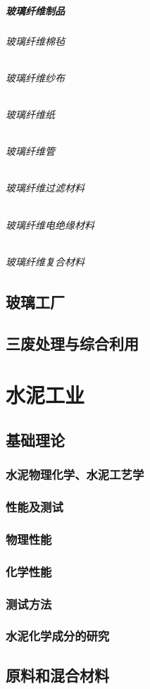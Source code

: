\documentclass[UTF8]{../../ApplicationUniverse}
\begin{document}
            \paragraph{玻璃纤维制品}
                \subparagraph{玻璃纤维棉毡}
                \subparagraph{玻璃纤维纱布}
                \subparagraph{玻璃纤维纸}
                \subparagraph{玻璃纤维管}
                \subparagraph{玻璃纤维过滤材料}
                \subparagraph{玻璃纤维电绝缘材料}
                \subparagraph{玻璃纤维复合材料}
\section{玻璃工厂}
\section{三废处理与综合利用}







\chapter{水泥工业}
\section{基础理论}
    \subsection{水泥物理化学、水泥工艺学}
    \subsection{性能及测试}
    \subsection{物理性能}
    \subsection{化学性能}
    \subsection{测试方法}
    \subsection{水泥化学成分的研究}
\section{原料和混合材料}
\end{document}

